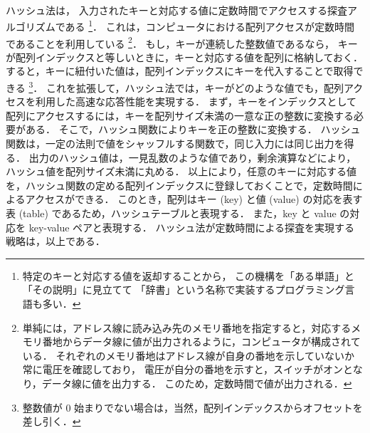 \pagestyle{empty} %

　\\
\\
\\
\\
\\
\\
\\
\\

ハッシュ法は，
入力されたキーと対応する値に定数時間でアクセスする探査アルゴリズムである
\footnote{
特定のキーと対応する値を返却することから，
この機構を「ある単語」と「その説明」に見立てて
「辞書」という名称で実装するプログラミング言語も多い．
}．
これは，コンピュータにおける配列アクセスが定数時間であることを利用している
\footnote{
単純には，アドレス線に読み込み先のメモリ番地を指定すると，対応するメモリ番地からデータ線に値が出力されるように，コンピュータが構成されている．
それぞれのメモリ番地はアドレス線が自身の番地を示していないか常に電圧を確認しており，
電圧が自分の番地を示すと，スイッチがオンとなり，データ線に値を出力する．
このため，定数時間で値が出力される．
}．
もし，キーが連続した整数値であるなら，
キーが配列インデックスと等しいときに，キーと対応する値を配列に格納しておく．
すると，キーに紐付いた値は，配列インデックスにキーを代入することで取得できる
\footnote{
整数値が 0 始まりでない場合は，当然，配列インデックスからオフセットを差し引く．
}．
これを拡張して，ハッシュ法では，キーがどのような値でも，配列アクセスを利用した高速な応答性能を実現する．
まず，キーをインデックスとして配列にアクセスするには，キーを配列サイズ未満の一意な正の整数に変換する必要がある．
そこで，ハッシュ関数によりキーを正の整数に変換する．
ハッシュ関数は，一定の法則で値をシャッフルする関数で，同じ入力には同じ出力を得る．
出力のハッシュ値は，一見乱数のような値であり，剰余演算などにより，ハッシュ値を配列サイズ未満に丸める．
以上により，任意のキーに対応する値を，ハッシュ関数の定める配列インデックスに登録しておくことで，定数時間によるアクセスができる．
このとき，配列はキー (key) と値 (value) の対応を表す表 (table) であるため，ハッシュテーブルと表現する．
また，key と value の対応を key-value ペアと表現する．
ハッシュ法が定数時間による探査を実現する戦略は，以上である．


